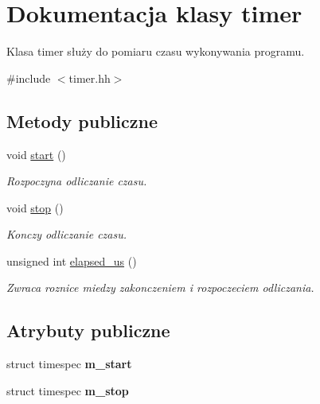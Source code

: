 \hypertarget{classtimer}{\section{\-Dokumentacja klasy timer}
\label{classtimer}
}


\-Klasa timer służy do pomiaru czasu wykonywania programu.  




{\ttfamily \#include $<$timer.\-hh$>$}

\subsection*{\-Metody publiczne}
\begin{DoxyCompactItemize}
\item 
void \hyperlink{classtimer_a9aa894a57748b2bdf3adce46f5736794}{start} ()
\begin{DoxyCompactList}\small\item\em \-Rozpoczyna odliczanie czasu. \end{DoxyCompactList}\item 
void \hyperlink{classtimer_a3218d61649e284071544b17c8c915ecc}{stop} ()
\begin{DoxyCompactList}\small\item\em \-Konczy odliczanie czasu. \end{DoxyCompactList}\item 
unsigned int \hyperlink{classtimer_ad4f64bfba81d59d6712e21332c544cd7}{elapsed\-\_\-us} ()
\begin{DoxyCompactList}\small\item\em \-Zwraca roznice miedzy zakonczeniem i rozpoczeciem odliczania. \end{DoxyCompactList}\end{DoxyCompactItemize}
\subsection*{\-Atrybuty publiczne}
\begin{DoxyCompactItemize}
\item 
\hypertarget{classtimer_ad58e5d25d94d6758731d64b943c059d9}{struct timespec {\bfseries m\-\_\-start}}\label{classtimer_ad58e5d25d94d6758731d64b943c059d9}

\item 
\hypertarget{classtimer_a215cff76d3f6abc54112640367d0a07c}{struct timespec {\bfseries m\-\_\-stop}}\label{classtimer_a215cff76d3f6abc54112640367d0a07c}

\end{DoxyCompactItemize}


